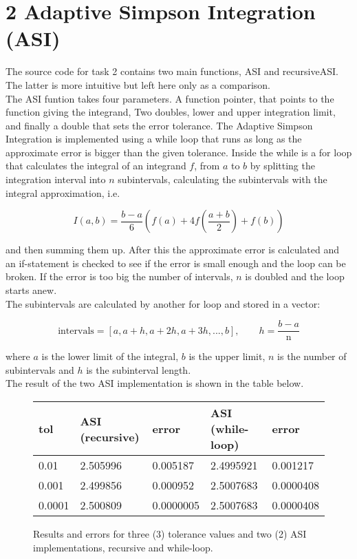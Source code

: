 \documentclass[a4paper, 11pt]{report}
\begin{document}
\section*{2 Adaptive Simpson Integration (ASI)}


The source code for task 2 contains two main functions, ASI and recursiveASI. The latter is more intuitive but left here only as a comparison.\\

The ASI funtion takes four parameters. A function pointer, that points to the function giving the integrand, Two doubles, lower and upper integration limit, and finally a double that sets the error tolerance. The Adaptive Simpson Integration is implemented using a while loop that runs as long as the approximate error is bigger than the given tolerance. Inside the while is a for loop that calculates the integral of an integrand $f$, from $a$ to $b$ by splitting the integration interval into $n$ subintervals, calculating the subintervals with the integral approximation, i.e.

$$ I(a,b) = \frac{b-a}{6} \left (f(a)+4f\left(\frac{a+b}{2}\right) +f(b) \right )$$

and then summing them up. After this the approximate error is calculated and an if-statement is checked to see if the error is small enough and the loop can be broken. If the error is too big the number of intervals, $n$ is doubled and the loop starts anew.\\

The subintervals are calculated by another for loop and stored in a vector: 

$$ \textrm{intervals} = [ a, a+h, a+2h,a+3h,..., b ], \qquad   h = \frac{b-a}{\textrm{n}}$$

where $a$ is the lower limit of the integral, $b$ is the upper limit, $n$ is the number of subintervals and $h$ is the subinterval length.\\

The result of the two ASI implementation is shown in the table below.

 \begin{figure}[htbp]
 \begin{center}
   \begin{tabular}{ l || l  l |  l  l }
     tol & ASI (recursive) & error  & ASI (while-loop) & error \\ \hline
     0.01     & 2.505996 & 0.005187   & 2.4995921 & 0.001217\\ %
     0.001   & 2.499856 & 0.000952   & 2.5007683 & 0.0000408\\
     0.0001 & 2.500809 & 0.0000005  & 2.5007683 & 0.0000408\\  %
   \end{tabular}
 \end{center}
 \caption[table]{Results and errors for three (3) tolerance values and two (2) ASI implementations, recursive and while-loop.}
 	\label{fig:21}
 \end{figure}
\end{document}
